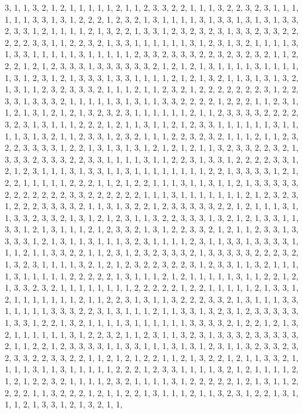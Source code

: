 \documentclass[
]{article}
\begin{document}
\begin{Schunk}
\begin{Soutput}
3, 1, 1, 3, 2, 1, 2, 1, 1, 1, 1, 1, 2, 1, 1, 2, 3, 3, 2, 2, 1, 1, 1, 3, 2, 2, 3, 2, 3, 1, 1, 1, 1, 1, 1, 3, 3, 1, 3, 1, 2, 2, 2, 1, 2, 3, 2, 1, 3, 1, 1, 1, 1, 3, 1, 3, 3, 1, 3, 1, 3, 1, 3, 3, 2, 3, 3, 1, 2, 1, 1, 1, 1, 2, 1, 3, 2, 2, 1, 3, 3, 1, 2, 3, 2, 3, 2, 3, 1, 3, 3, 2, 3, 3, 2, 2, 2, 2, 2, 3, 3, 1, 1, 2, 2, 3, 2, 1, 3, 3, 1, 1, 1, 1, 1, 1, 3, 1, 2, 3, 1, 3, 2, 1, 1, 1, 1, 3, 1, 3, 3, 1, 1, 1, 1, 1, 3, 1, 1, 1, 1, 1, 2, 3, 3, 2, 3, 3, 3, 2, 2, 3, 2, 3, 2, 3, 2, 1, 1, 2, 2, 2, 1, 2, 1, 2, 3, 3, 3, 1, 3, 3, 3, 3, 3, 3, 2, 1, 2, 1, 2, 1, 3, 1, 1, 1, 1, 3, 1, 1, 1, 1, 1, 3, 1, 2, 3, 1, 2, 1, 3, 3, 3, 1, 3, 3, 1, 1, 1, 1, 2, 1, 2, 1, 3, 2, 1, 1, 3, 1, 3, 1, 3, 2, 1, 3, 1, 1, 2, 3, 2, 3, 3, 3, 2, 1, 1, 1, 2, 1, 1, 2, 3, 2, 1, 2, 2, 2, 2, 2, 2, 2, 3, 1, 2, 2, 3, 3, 1, 3, 3, 3, 2, 1, 1, 1, 1, 1, 3, 1, 3, 1, 1, 3, 3, 2, 2, 2, 2, 1, 2, 2, 2, 1, 1, 2, 3, 1, 1, 2, 1, 3, 1, 2, 1, 2, 1, 3, 2, 3, 2, 3, 1, 1, 1, 1, 1, 1, 2, 1, 1, 2, 3, 3, 3, 3, 2, 2, 2, 2, 3, 2, 3, 1, 3, 1, 1, 1, 2, 2, 2, 1, 2, 1, 1, 3, 1, 1, 2, 1, 2, 3, 3, 1, 1, 1, 1, 1, 1, 3, 1, 1, 1, 1, 3, 1, 3, 2, 1, 1, 2, 3, 3, 1, 2, 3, 2, 1, 1, 1, 2, 2, 3, 2, 3, 2, 1, 1, 1, 2, 1, 1, 2, 3, 2, 2, 3, 3, 3, 3, 1, 2, 2, 1, 3, 1, 3, 1, 3, 1, 2, 1, 2, 1, 2, 1, 1, 3, 2, 3, 3, 2, 2, 3, 2, 1, 3, 3, 3, 2, 3, 3, 3, 2, 2, 3, 3, 1, 1, 1, 1, 3, 1, 1, 2, 2, 3, 1, 3, 3, 1, 2, 2, 2, 2, 3, 3, 1, 2, 1, 2, 3, 1, 1, 1, 3, 1, 3, 3, 1, 1, 3, 1, 1, 1, 1, 1, 1, 1, 1, 2, 2, 1, 3, 3, 3, 3, 1, 2, 1, 2, 2, 1, 1, 1, 1, 1, 2, 2, 2, 1, 1, 2, 1, 2, 2, 1, 1, 1, 3, 1, 1, 3, 1, 1, 2, 1, 3, 3, 3, 3, 3, 2, 2, 2, 2, 2, 2, 2, 3, 3, 2, 2, 2, 2, 2, 2, 1, 1, 1, 3, 1, 1, 1, 1, 1, 1, 1, 2, 1, 2, 3, 2, 3, 1, 2, 2, 2, 3, 3, 3, 3, 2, 1, 1, 3, 1, 3, 2, 2, 1, 2, 3, 3, 3, 3, 3, 2, 2, 1, 2, 1, 1, 1, 3, 1, 1, 3, 3, 2, 3, 3, 2, 1, 3, 1, 2, 1, 2, 3, 1, 1, 3, 2, 2, 3, 3, 3, 1, 3, 2, 1, 2, 1, 3, 3, 1, 1, 3, 3, 1, 2, 1, 3, 1, 1, 1, 2, 1, 2, 3, 3, 2, 1, 3, 1, 2, 2, 3, 3, 2, 1, 2, 1, 1, 2, 3, 3, 1, 3, 3, 3, 3, 1, 2, 1, 3, 1, 1, 3, 1, 1, 1, 3, 2, 3, 1, 1, 1, 1, 2, 3, 1, 1, 3, 3, 1, 3, 3, 3, 3, 1, 1, 1, 2, 1, 1, 3, 3, 2, 2, 1, 1, 2, 3, 1, 2, 3, 2, 3, 3, 3, 2, 1, 3, 3, 3, 3, 3, 2, 2, 2, 3, 2, 1, 3, 2, 3, 1, 1, 1, 1, 3, 2, 1, 2, 1, 2, 3, 2, 2, 3, 2, 2, 3, 1, 2, 3, 3, 1, 1, 3, 2, 1, 1, 1, 1, 3, 1, 1, 1, 1, 1, 2, 2, 2, 2, 2, 1, 3, 1, 1, 1, 2, 1, 2, 1, 1, 1, 1, 1, 3, 1, 1, 2, 2, 1, 2, 1, 3, 3, 2, 3, 2, 1, 1, 1, 1, 1, 1, 1, 1, 2, 2, 2, 2, 2, 1, 2, 2, 1, 1, 1, 1, 1, 2, 1, 3, 3, 1, 2, 1, 1, 1, 1, 1, 1, 1, 2, 1, 1, 2, 2, 3, 1, 3, 1, 1, 3, 2, 2, 2, 3, 3, 2, 1, 3, 1, 1, 1, 3, 3, 1, 1, 1, 1, 1, 3, 3, 3, 2, 2, 3, 1, 3, 1, 1, 1, 2, 1, 1, 3, 3, 1, 3, 2, 3, 1, 2, 3, 3, 3, 3, 3, 1, 3, 3, 1, 2, 2, 1, 3, 2, 1, 1, 1, 1, 3, 1, 1, 1, 1, 1, 1, 3, 3, 3, 3, 2, 1, 2, 2, 1, 2, 1, 3, 2, 1, 1, 1, 1, 1, 1, 3, 1, 2, 2, 3, 2, 1, 1, 2, 3, 1, 1, 3, 2, 3, 1, 3, 3, 3, 2, 3, 3, 3, 3, 3, 2, 1, 1, 2, 2, 1, 2, 3, 3, 3, 3, 1, 1, 3, 3, 1, 1, 1, 3, 1, 3, 1, 2, 3, 1, 1, 3, 2, 3, 3, 2, 3, 2, 3, 3, 2, 2, 3, 3, 2, 2, 1, 1, 2, 1, 2, 1, 2, 2, 1, 1, 2, 1, 3, 2, 2, 1, 2, 1, 1, 3, 3, 2, 1, 1, 1, 1, 3, 1, 1, 3, 1, 1, 1, 1, 1, 2, 2, 2, 1, 2, 3, 3, 1, 1, 1, 1, 3, 2, 1, 2, 1, 1, 1, 1, 2, 1, 2, 1, 2, 2, 3, 2, 1, 1, 1, 1, 2, 3, 2, 1, 1, 1, 1, 3, 1, 2, 2, 2, 2, 2, 1, 2, 1, 3, 1, 1, 2, 2, 2, 2, 1, 1, 3, 2, 2, 2, 1, 2, 1, 1, 2, 2, 1, 3, 1, 1, 1, 2, 1, 1, 3, 2, 3, 1, 2, 2, 1, 3, 1, 1, 1, 2, 1, 3, 3, 1, 2, 1, 3, 2, 1, 1, 
\end{Soutput}
\end{Schunk}
\end{document}
